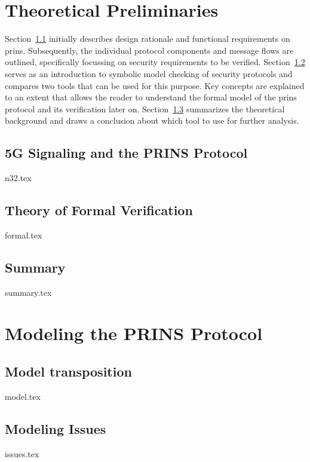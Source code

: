 \documentclass[a4paper,12pt,twoside]{report}
\begin{document}
\clearpage

\chapter{Theoretical Preliminaries}
\label{chap:theory}

Section~\ref{sec:n32} initially describes design rationale and functional requirements on \gls{prins}.
Subsequently, the individual protocol components and message flows are outlined, specifically focussing on security requirements to be verified.
Section~\ref{sec:formal} serves as an introduction to symbolic model checking of security protocols and compares two tools that can be used for this purpose.
Key concepts are explained to an extent that allows the reader to understand the formal model of the \gls{prins} protocol and its verification later on.
Section~\ref{sec:summary} summarizes the theoretical background and draws a conclusion about which tool to use for further analysis.

\section{5G Signaling and the PRINS Protocol}
\label{sec:n32}
{n32.tex}

\section{Theory of Formal Verification}
\label{sec:formal}
{formal.tex}

\section{Summary}
\label{sec:summary}
{summary.tex}

\clearpage

\chapter{Modeling the PRINS Protocol}
\label{chap:modeling}

\section{Model transposition}
\label{sec:model}
{model.tex}

\section{Modeling Issues}
\label{sec:issues}
{issues.tex}
\end{document}
